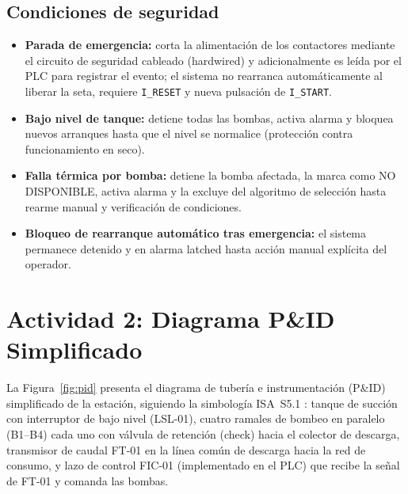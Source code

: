 \documentclass[conference]{IEEEtran}
\begin{document}
\subsection{Condiciones de seguridad}
\begin{itemize}
    \item \textbf{Parada de emergencia:} corta la alimentación de los contactores mediante el circuito de seguridad cableado (hardwired) y adicionalmente es leída por el PLC para registrar el evento; el sistema no rearranca automáticamente al liberar la seta, requiere \texttt{I\_RESET} y nueva pulsación de \texttt{I\_START}.
    \item \textbf{Bajo nivel de tanque:} detiene todas las bombas, activa alarma y bloquea nuevos arranques hasta que el nivel se normalice (protección contra funcionamiento en seco).
    \item \textbf{Falla térmica por bomba:} detiene la bomba afectada, la marca como NO DISPONIBLE, activa alarma y la excluye del algoritmo de selección hasta rearme manual y verificación de condiciones.
    \item \textbf{Bloqueo de rearranque automático tras emergencia:} el sistema permanece detenido y en alarma latched hasta acción manual explícita del operador.
\end{itemize}

\section{Actividad 2: Diagrama P\&ID Simplificado}
\label{sec:pid}

La Figura~\ref{fig:pid} presenta el diagrama de tubería e instrumentación (P\&ID) simplificado de la estación, siguiendo la simbología ISA~S5.1 \cite{isa_s51}: tanque de succión con interruptor de bajo nivel (LSL-01), cuatro ramales de bombeo en paralelo (B1--B4) cada uno con válvula de retención (check) hacia el colector de descarga, transmisor de caudal FT-01 en la línea común de descarga hacia la red de consumo, y lazo de control FIC-01 (implementado en el PLC) que recibe la señal de FT-01 y comanda las bombas.
\end{document}
